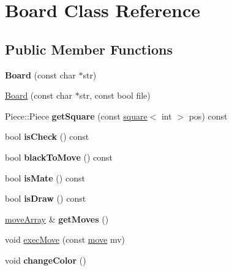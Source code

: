 \hypertarget{classBoard}{}\section{Board Class Reference}
\label{classBoard}
\subsection*{Public Member Functions}
\begin{DoxyCompactItemize}
\item 
\mbox{\label{classBoard_a155259ecd3131cbf8c155c1dd19026b0}} 
{\bfseries Board} (const char $\ast$str)
\item 
\hyperlink{classBoard_a8dd2a85d6b43bcab4eaf83e1541aeb18}{Board} (const char $\ast$str, const bool file)
\item 
\mbox{\label{classBoard_a8359f43f59d4eb04c679f0415c26add4}} 
Piece\+::\+Piece {\bfseries get\+Square} (const \hyperlink{structsquare}{square}$<$ int $>$ pos) const
\item 
\mbox{\label{classBoard_a58ee677360099107d0d33becdc2af888}} 
bool {\bfseries is\+Check} () const
\item 
\mbox{\label{classBoard_a78089ae51f1e8e02dfec7c739f3ca74a}} 
bool {\bfseries black\+To\+Move} () const
\item 
\mbox{\label{classBoard_adfdc9dd19eb4119b6926a70c89db7d31}} 
bool {\bfseries is\+Mate} () const
\item 
\mbox{\label{classBoard_a6a9553957873a05f9cca67f8f0677b74}} 
bool {\bfseries is\+Draw} () const
\item 
\mbox{\label{classBoard_a993b2839790b3fbe4b1c6ba2a2257fe1}} 
\hyperlink{structmoveArray}{move\+Array} \& {\bfseries get\+Moves} ()
\item 
void \hyperlink{classBoard_a5732564ae8ce7f247072ded83f71dc75}{exec\+Move} (const \hyperlink{structmove}{move} mv)
\item 
\mbox{\label{classBoard_ac33aaf879882d2c1abbab14c9727f2f9}} 
void {\bfseries change\+Color} ()
\item 

\end{DoxyCompactItemize}
